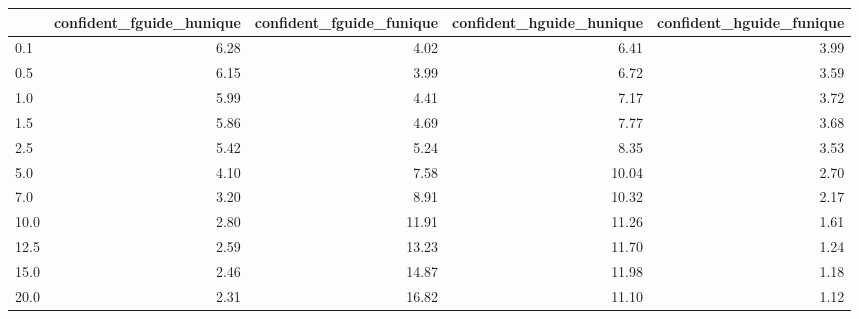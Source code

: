 \begin{tabular}{lrrrr}
\toprule
 & confident_fguide_hunique & confident_fguide_funique & confident_hguide_hunique & confident_hguide_funique \\
\midrule
0.1 & 6.28 & 4.02 & 6.41 & 3.99 \\
0.5 & 6.15 & 3.99 & 6.72 & 3.59 \\
1.0 & 5.99 & 4.41 & 7.17 & 3.72 \\
1.5 & 5.86 & 4.69 & 7.77 & 3.68 \\
2.5 & 5.42 & 5.24 & 8.35 & 3.53 \\
5.0 & 4.10 & 7.58 & 10.04 & 2.70 \\
7.0 & 3.20 & 8.91 & 10.32 & 2.17 \\
10.0 & 2.80 & 11.91 & 11.26 & 1.61 \\
12.5 & 2.59 & 13.23 & 11.70 & 1.24 \\
15.0 & 2.46 & 14.87 & 11.98 & 1.18 \\
20.0 & 2.31 & 16.82 & 11.10 & 1.12 \\
\bottomrule
\end{tabular}
